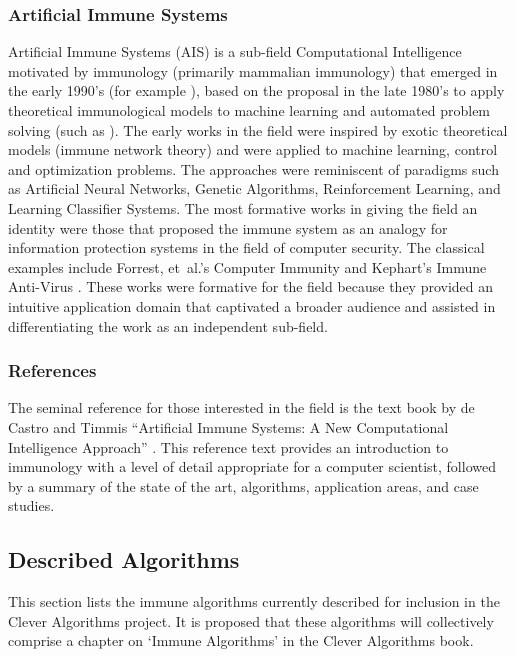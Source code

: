 \documentclass[a4paper, 11pt]{article}
\begin{document}
\subsubsection{Artificial Immune Systems}
Artificial Immune Systems (AIS) is a sub-field Computational Intelligence motivated by immunology (primarily mammalian immunology) that emerged in the early 1990's (for example \cite{Bersini1990, Ishida1990}), based on the proposal in the late 1980's to apply theoretical immunological models to machine learning and automated problem solving (such as \cite{Hoffmann1986, Farmer1986}). The early works in the field were inspired by exotic theoretical models (immune network theory) and were applied to machine learning, control and optimization problems. The approaches were reminiscent of paradigms such as Artificial Neural Networks, Genetic Algorithms, Reinforcement Learning, and Learning Classifier Systems. The most formative works in giving the field an identity were those that proposed the immune system as an analogy for information protection systems in the field of computer security. The classical examples include Forrest, et~al.'s Computer Immunity \cite{Forrest1994, Forrest1997a} and Kephart's Immune Anti-Virus \cite{Kephart1994, Kephart1995}. These works were formative for the field because they provided an intuitive application domain that captivated a broader audience and assisted in differentiating the work as an independent sub-field.

\subsubsection{References}
The seminal reference for those interested in the field is the text book by de Castro and Timmis ``Artificial Immune Systems: A New Computational Intelligence Approach'' \cite{Castro2002}. This reference text provides an introduction to immunology with a level of detail appropriate for a computer scientist, followed by a summary of the state of the art, algorithms, application areas, and case studies. 

% 
% 
\subsection{Described Algorithms}
\label{subsec:algorithms}
This section lists the immune algorithms currently described for inclusion in the Clever Algorithms project. It is proposed that these algorithms will collectively comprise a chapter on `Immune Algorithms' in the Clever Algorithms book. 
\end{document}
